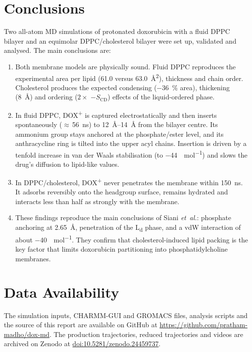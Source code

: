 \documentclass[11pt,a4paper]{article}
\newcommand{\dox}{DOX\textsuperscript{+}}
\newcommand{\scd}{S_{\mathrm{CD}}}
\newcommand{\Ld}{L\textsubscript{d}}
\begin{document}
\section{Conclusions}
\label{sec:conclusions}
Two all-atom MD simulations of protonated doxorubicin with a fluid DPPC bilayer and an equimolar
DPPC/cholesterol bilayer were set up, validated and analysed. The main conclusions are:
\begin{enumerate}[label=\arabic*.]
  \item Both membrane models are physically sound. Fluid DPPC reproduces the experimental area per
        lipid (\SI{61.0}{} versus \SI{63.0}{\angstrom^2}), thickness and chain order. Cholesterol
        produces the expected condensing (\SI{-36}{\percent} area), thickening (\SI{+8}{\angstrom}) and
        ordering ($2\times$ $-\scd$) effects of the liquid-ordered phase.
  \item In fluid DPPC, \dox{} is captured electrostatically and then inserts spontaneously
        ($\approx$\,\SI{56}{ns}) to \SI{12}{\angstrom}--\SI{14}{\angstrom} from the bilayer centre. Its
        ammonium group stays anchored at the phosphate/ester level, and its anthracycline ring is tilted
        into the upper acyl chains. Insertion is driven by a tenfold increase in van der Waals
        stabilisation (to \SI{-44}{\kcal\per\mol}) and slows the drug's diffusion to lipid-like values.
  \item In DPPC/cholesterol, \dox{} never penetrates the membrane within \SI{150}{ns}. It adsorbs
        reversibly onto the headgroup surface, remains hydrated and interacts less than half as
        strongly with the membrane.
  \item These findings reproduce the main conclusions of Siani \emph{et~al.}: phosphate anchoring at
        \SI{2.65}{\angstrom}, penetration of the \Ld{} phase, and a vdW interaction of about
        \SI{-40}{\kcal\per\mol}. They confirm that cholesterol-induced lipid packing is the key factor
        that limits doxorubicin partitioning into phosphatidylcholine membranes.
\end{enumerate}

\section*{Data Availability}
The simulation inputs, CHARMM-GUI and GROMACS files, analysis scripts and the source of this report are
available on GitHub at \url{https://github.com/pratham-madho/dox-md}. The production trajectories,
reduced trajectories and videos are archived on Zenodo at
\href{https://doi.org/10.5281/zenodo.24459737}{doi:10.5281/zenodo.24459737}.
\end{document}
